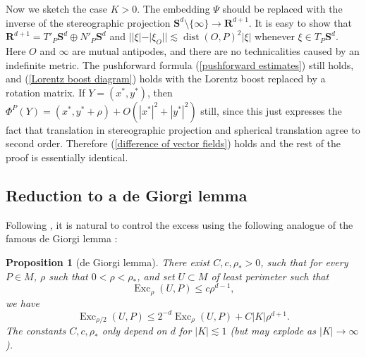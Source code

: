\documentclass[reqno,10pt]{amsart}
\newcommand{\RR}{\mathbf{R}}
\newcommand{\Sph}{\mathbf S}
\DeclareMathOperator{\Exc}{Exc}
\DeclareMathOperator{\dist}{dist}
\newtheorem{proposition}[theorem]{Proposition}
\theoremstyle{definition}
\numberwithin{equation}{section}
\begin{document}
Now we sketch the case $K > 0$.
The embedding $\Psi$ should be replaced with the inverse of the stereographic projection $\Sph^d \setminus \{\infty\} \to \RR^{d + 1}$.
It is easy to show that $\RR^{d + 1} = T'_P \Sph^d \oplus N'_P \Sph^d$ and $||\xi| - |\xi_O|| \lesssim \dist(O, P)^2 |\xi|$ whenever $\xi \in T_P \Sph^d$.
Here $O$ and $\infty$ are mutual antipodes, and there are no technicalities caused by an indefinite metric.
The pushforward formula (\ref{pushforward estimates}) still holds, and (\ref{Lorentz boost diagram}) holds with the Lorentz boost replaced by a rotation matrix.
If $Y = (x^*, y^*)$, then $\Phi^P(Y) = (x^*, y^* + \rho) + O(|x^*|^2 + |y^*|^2)$ still, since this just expresses the fact that translation in stereographic projection and spherical translation agree to second order.
Therefore (\ref{difference of vector fields}) holds and the rest of the proof is essentially identical.


\subsection{Reduction to a de Giorgi lemma}
Following \cite{Miranda66,Giusti77,deGiorgi61}, it is natural to control the excess using the following analogue of the famous de Giorgi lemma \cite[Theorem 8.1]{Giusti77}:

\begin{proposition}[de Giorgi lemma]\label{de Giorgi}
There exist $C, c, \rho_* > 0$, such that for every $P \in M$, $\rho$ such that $0 < \rho < \rho_*$, and set $U \subset M$ of least perimeter such that 
$$\Exc_\rho(U, P) \leq c\rho^{d - 1},$$
we have 
\begin{equation}\label{dGL concl}
\Exc_{\rho/2}(U, P) \leq 2^{-d} \Exc_\rho(U, P) + C|K|\rho^{d + 1}.
\end{equation}
The constants $C, c, \rho_*$ only depend on $d$ for $|K| \lesssim 1$ (but may explode as $|K| \to \infty$).
\end{proposition}
\end{document}
